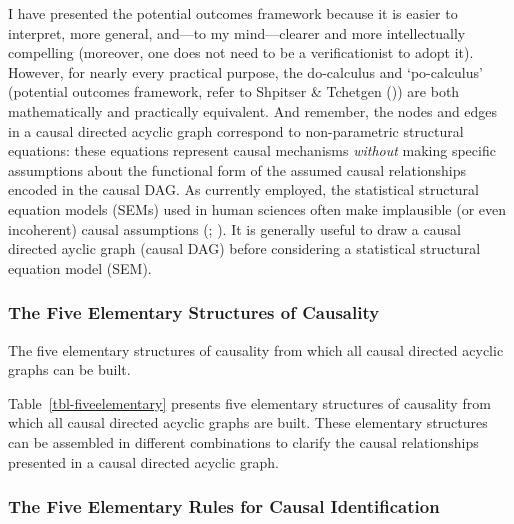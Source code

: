 \documentclass[
  single column]{article}
\begin{document}
I have presented the potential outcomes framework because it is easier
to interpret, more general, and---to my mind---clearer and more
intellectually compelling (moreover, one does not need to be a
verificationist to adopt it). However, for nearly every practical
purpose, the do-calculus and `po-calculus' (potential outcomes
framework, refer to Shpitser \& Tchetgen
()) are both mathematically and
practically equivalent. And remember, the nodes and edges in a causal
directed acyclic graph correspond to non-parametric structural
equations: these equations represent causal mechanisms \emph{without}
making specific assumptions about the functional form of the assumed
causal relationships encoded in the causal DAG. As currently employed,
the statistical structural equation models (SEMs) used in human sciences
often make implausible (or even incoherent) causal assumptions
(;
). It is generally
useful to draw a causal directed ayclic graph (causal DAG) before
considering a statistical structural equation model (SEM).

\subsubsection{The Five Elementary Structures of
Causality}\label{the-five-elementary-structures-of-causality}

\begin{table}

\caption{\label{tbl-fiveelementary}The five elementary structures of
causality from which all causal directed acyclic graphs can be built.}

\centering{

\terminologydirectedgraph

}

\end{table}%

Table~\ref{tbl-fiveelementary} presents five elementary structures of
causality from which all causal directed acyclic graphs are built. These
elementary structures can be assembled in different combinations to
clarify the causal relationships presented in a causal directed acyclic
graph.

\newpage{}

\subsubsection{The Five Elementary Rules for Causal
Identification}\label{the-five-elementary-rules-for-causal-identification}
\end{document}
